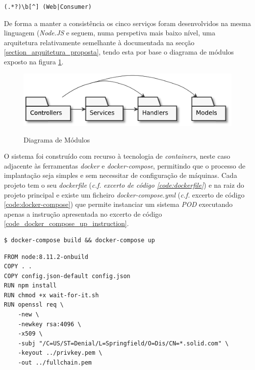 \begin{lstlisting}[caption={Expressão regular}, label={code_regex_projects_name}]
(.*?)\b[^] (Web|Consumer)
\end{lstlisting}

De forma a manter a consistência os cinco serviços foram desenvolvidos na mesma linguagem (\emph{Node.JS} e seguem, numa perspetiva mais baixo nível, uma arquitetura relativamente semelhante à documentada na secção \ref{section_arquitetura_proposta}, tendo esta por base o diagrama de módulos exposto na figura \ref{implementation_module_diagram}.

\begin{figure}[H]
    \begin{center}
    \includegraphics[width=0.6 \textwidth]{figures/module_diagram.eps}
    \label{implementation_module_diagram}
    \caption{Diagrama de Módulos}
    \end{center}
\end{figure}

O sistema foi construído com recurso à tecnologia de \emph{containers}, neste caso adjacente às ferramentas \emph{docker} e \emph{docker-compose}, permitindo que o processo de implantação seja simples e sem necessitar de configuração de máquinas. Cada projeto tem o seu \emph{dockerfile} (\emph{\emph{c.f.} excerto de código \ref{code:dockerfile}}) e na raiz do projeto principal e existe um ficheiro \emph{docker-compose.yml} (\emph{c.f.} excerto de código \ref{code:docker-compose}) que permite instanciar um sistema \emph{\acrshort{POD}} executando apenas a instrução apresentada no excerto de código \ref{code_docker_compose_up_instruction}.

\begin{lstlisting}[caption={Expressão regular}, label={code_docker_compose_up_instruction}]
$ docker-compose build && docker-compose up
\end{lstlisting}

\begin{lstlisting}[language=docker,caption={Ficheiro Dockerfile},breaklines=true,label={code:dockerfile}]
FROM node:8.11.2-onbuild
COPY . .
COPY config.json-default config.json
RUN npm install
RUN chmod +x wait-for-it.sh
RUN openssl req \
    -new \
    -newkey rsa:4096 \
    -x509 \
    -subj "/C=US/ST=Denial/L=Springfield/O=Dis/CN=*.solid.com" \
    -keyout ../privkey.pem \
    -out ../fullchain.pem
\end{lstlisting}

